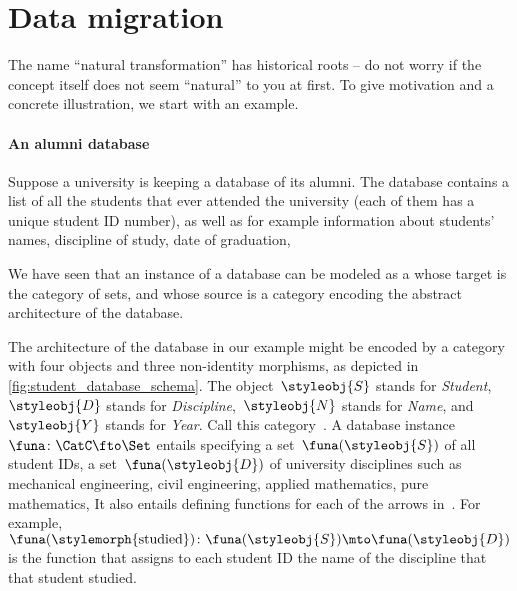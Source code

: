 
\section{Data migration}

The name ``natural transformation'' has historical roots -- do not worry if the concept itself does not seem ``natural'' to you at first.
To give motivation and a concrete illustration, we start with an example.

\paragraph{An alumni database}

Suppose a university is keeping a database of its alumni.
The database contains a list of all the students that ever attended the university (each of them has a unique student ID number), as well as for example information about students' names, discipline of study, date of graduation, \etc

We have seen that an instance of a database can be modeled as a  whose target is the category of sets, and whose source is a category encoding the abstract architecture of the database.

%
\begin{marginfigure}
    \centering
    \caption{}
    \label{fig:student_database_schema}
\end{marginfigure}
%

The architecture of the database in our example might be encoded by a category with four objects and three non-identity morphisms, as depicted in \cref{fig:student_database_schema}.
The object~$\styleobj{S}$ stands for \emph{Student},~$\styleobj{D}$ stands for \emph{Discipline},~$\styleobj{N}$ stands for \emph{Name}, and~$\styleobj{Y}$ stands for \emph{Year}.
Call this category~\CatC.
A database instance~$\funa \colon \CatC \fto \Set$ entails specifying a set~$\funa(\styleobj{S})$ of all student IDs, a set~$\funa(\styleobj{D})$ of university disciplines such as mechanical engineering, civil engineering, applied mathematics, pure mathematics, \etc
It also entails defining functions for each of the arrows in~\CatC.
For example,~$\funa(\stylemorph{\text{studied}}) \colon \funa(\styleobj{S}) \mto \funa(\styleobj{D})$ is the function that assigns to each student ID the name of the discipline that that student studied.

